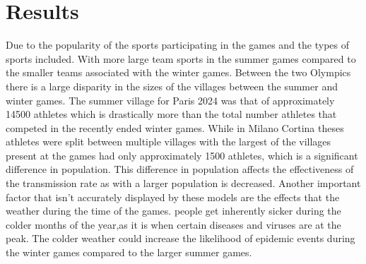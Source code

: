 \documentclass[12pt, oneside]{article}
\begin{document}
\section*{Results}
Due to the popularity of the sports participating in the games and the types of sports included. With more large team sports in the summer games compared to the smaller teams associated with the winter games. Between the two Olympics there is a large disparity in the sizes of the villages between the summer and winter games. The summer village for Paris 2024 was that of approximately 14500 athletes\cite{fenton_2024_take} which is drastically more than the total number athletes that competed in the recently ended winter games. While in Milano Cortina theses athletes were split between multiple villages with the largest of the villages present at the games had only approximately 1500 athletes\cite{mcdermott_2026_inside}, which is a significant difference in population. This difference in population affects the effectiveness of the transmission rate as with a larger population is decreased.  Another important factor that isn't accurately displayed by these models are the effects that the weather during the time of the games. people get inherently sicker during the colder months of the year,as it is when certain diseases and viruses are at the peak. \cite{polgreen2018infectious} The colder weather could increase the likelihood of epidemic events during the winter games compared to the larger summer games.
\end{document}
